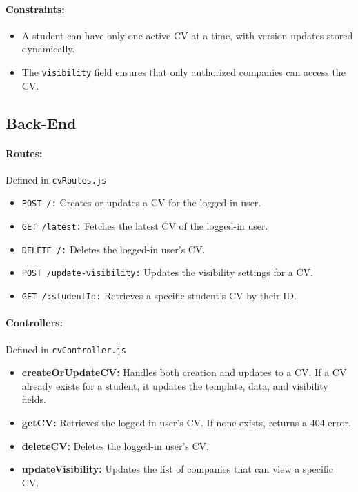 \paragraph{Constraints:}
\begin{itemize}
    \item A student can have only one active CV at a time, with version updates stored dynamically.
    \item The \texttt{visibility} field ensures that only authorized companies can access the CV.
\end{itemize}

\subsection*{Back-End}
\paragraph{Routes:} Defined in \texttt{cvRoutes.js}
\begin{itemize}
    \item \texttt{POST /:} Creates or updates a CV for the logged-in user.
    \item \texttt{GET /latest:} Fetches the latest CV of the logged-in user.
    \item \texttt{DELETE /:} Deletes the logged-in user’s CV.
    \item \texttt{POST /update-visibility:} Updates the visibility settings for a CV.
    \item \texttt{GET /:studentId:} Retrieves a specific student’s CV by their ID.
\end{itemize}

\paragraph{Controllers:} Defined in \texttt{cvController.js}
\begin{itemize}
    \item \textbf{createOrUpdateCV:} Handles both creation and updates to a CV. If a CV already exists for a student, it updates the template, data, and visibility fields.
    \item \textbf{getCV:} Retrieves the logged-in user’s CV. If none exists, returns a 404 error.
    \item \textbf{deleteCV:} Deletes the logged-in user’s CV.
    \item \textbf{updateVisibility:} Updates the list of companies that can view a specific CV.
\end{itemize}


